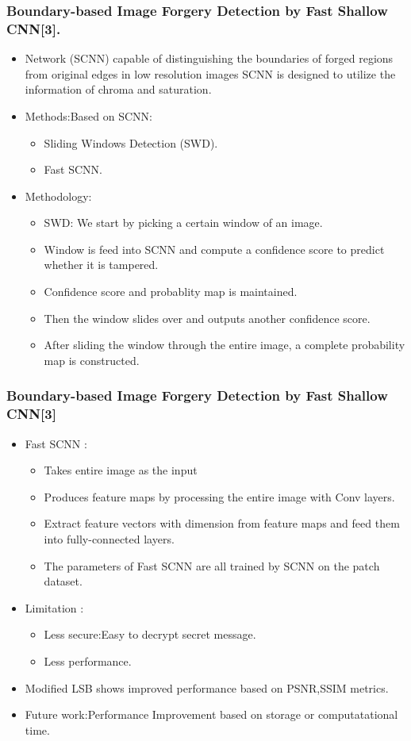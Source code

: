 \documentclass{beamer} %
\theoremstyle{definition} %
\begin{document}
\begin{frame}
\frametitle{Boundary-based Image Forgery Detection by Fast Shallow CNN[3].  }
\begin{itemize}
	\item{ Network (SCNN) capable of distinguishing the boundaries of
		forged regions from original edges in low resolution images 
		SCNN is designed to utilize the information of chroma and
		saturation.}
	\item{Methods:Based on SCNN:}
	\begin{itemize}
		\item Sliding Windows Detection (SWD).
		\item Fast SCNN.
	\end{itemize}
	\item {Methodology:}
	\begin{itemize}
		\item{SWD: We start by picking a certain window of an image.}
		\item Window is feed into SCNN and compute a confidence score to predict whether it is tampered. 
		\item Confidence score and probablity map is maintained.   
		\item Then the window slides over and outputs another confidence score. 
		\item After sliding the window through the entire image, a complete probability map is constructed.
    \end{itemize}
\end{itemize}
\end{frame}

\begin{frame}
 \frametitle{Boundary-based Image Forgery Detection by Fast Shallow CNN[3] }
 \begin{itemize}
       \item{Fast SCNN :}
       \begin{itemize}
       	\item Takes entire image as the input  
       	\item Produces feature maps by processing the entire image
			with Conv layers.
		\item Extract feature vectors with dimension from feature maps and feed them into fully-connected layers. 
		\item The parameters of Fast SCNN are all trained by SCNN on
			the patch dataset.
		\end{itemize}
	\end{itemize}
\begin{itemize}
	\item{Limitation :}
	\begin{itemize}
		\item {Less secure:Easy to decrypt secret message. }
		\item {Less performance.  }
	\end{itemize}
	\item{Modified LSB shows improved performance based on PSNR,SSIM metrics.} 
	\item{Future work:Performance Improvement based on storage or computatational time.}
\end{itemize}
\end{frame}
\end{document}
